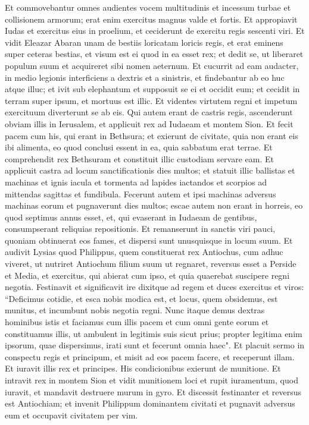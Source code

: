 \begin{biblechapter}
\verse Et commovebantur omnes audientes vocem multitudinis et incessum turbae et collisionem armorum; erat enim exercitus magnus valde et fortis.  
\verse Et appropiavit Iudas et exercitus eius in proelium, et ceciderunt de exercitu regis sescenti viri. 
\verse Et vidit Eleazar Abaran unam de bestiis loricatam loricis regis, et erat eminens super ceteras bestias, et visum est ei quod in ea esset rex; 
\verse et dedit se, ut liberaret populum suum et acquireret sibi nomen aeternum. 
\verse Et cucurrit ad eam audacter, in medio legionis interficiens a dextris et a sinistris, et findebantur ab eo huc atque illuc; 
\verse et ivit sub elephantum et supposuit se ei et occidit eum; et cecidit in terram super ipsum, et mortuus est illic. 
\verse Et videntes virtutem regni et impetum exercituum diverterunt se ab eis.  
\verse Qui autem erant de castris regis, ascenderunt obviam illis in Ierusalem, et applicuit rex ad Iudaeam et montem Sion. 
\verse Et fecit pacem cum his, qui erant in Bethsura; et exierunt de civitate, quia non erant eis ibi alimenta, eo quod conclusi essent in ea, quia sabbatum erat terrae. 
\verse Et comprehendit rex Bethsuram et constituit illic custodiam servare eam. 
\verse Et applicuit castra ad locum sanctificationis dies multos; et statuit illic ballistas et machinas et ignis iacula et tormenta ad lapides iactandos et scorpios ad mittendas sagittas et fundibula. 
\verse Fecerunt autem et ipsi machinas adversus machinas eorum et pugnaverunt dies multos; 
\verse escae autem non erant in horreis, eo quod septimus annus esset, et, qui evaserant in Iudaeam de gentibus, consumpserant reliquias repositionis. 
\verse Et remanserunt in sanctis viri pauci, quoniam obtinuerat eos fames, et dispersi sunt unusquisque in locum suum. 
\verse Et audivit Lysias quod Philippus, quem constituerat rex Antiochus, cum adhuc viveret, ut nutriret Antiochum filium suum ut regnaret, 
\verse reversus esset a Perside et Media, et exercitus, qui abierat cum ipso, et quia quaerebat suscipere regni negotia. 
\verse Festinavit et significavit ire dixitque ad regem et duces exercitus et viros: “Deficimus cotidie, et esca nobis modica est, et locus, quem obsidemus, est munitus, et incumbunt nobis negotia regni. 
\verse Nunc itaque demus dextras hominibus istis et faciamus cum illis pacem et cum omni gente eorum 
\verse et constituamus illis, ut ambulent in legitimis suis sicut prius; propter legitima enim ipsorum, quae dispersimus, irati sunt et fecerunt omnia haec". 
\verse Et placuit sermo in conspectu regis et principum, et misit ad eos pacem facere, et receperunt illam. 
\verse Et iuravit illis rex et principes. His condicionibus exierunt de munitione. 
\verse Et intravit rex in montem Sion et vidit munitionem loci et rupit iuramentum, quod iuravit, et mandavit destruere murum in gyro. 
\verse Et discessit festinanter et reversus est Antiochiam; et invenit Philippum dominantem civitati et pugnavit adversus eum et occupavit civitatem per vim. 
\end{biblechapter}

